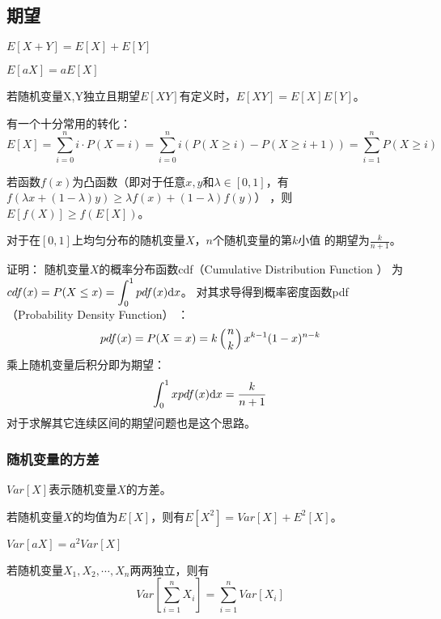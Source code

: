 \subsection{期望}
\begin{theorem}[期望的线性性质]
    $E[X+Y]=E[X]+E[Y]$
\end{theorem}
\begin{theorem}
    $E[aX]=aE[X]$
\end{theorem}
\begin{theorem}
    若随机变量X,Y独立且期望$E[XY]$有定义时，$E[XY]=E[X]E[Y]$。
\end{theorem}
有一个十分常用的转化：
\begin{displaymath}
    E[X]=\sum_{i=0}^n{i\cdot P(X=i)}
    =\sum_{i=0}^n{i(P(X\geq i)-P(X\geq i+1))}
    =\sum_{i=1}^n{P(X\geq i)}
\end{displaymath}
\begin{theorem}
    若函数$f(x)$为凸函数（即对于任意$x,y$和$\lambda\in [0,1]$，有
    $f(\lambda x+(1-\lambda)y)\geq\lambda f(x)+(1-\lambda)f(y)$）
    ，则$E[f(X)]\geq f(E[X])$。
\end{theorem}
\begin{theorem}
    对于在$[0,1]$上均匀分布的随机变量$X$，$n$个随机变量的第$k$小值
    的期望为$\frac{k}{n+1}$。
\end{theorem}
证明：
随机变量$X$的概率分布函数cdf（Cumulative Distribution Function
）
为$\displaystyle cdf(x)=P(X\leq x)=\int_0^1{pdf(x)\textrm{d} x}$。
对其求导得到概率密度函数pdf（Probability Density Function）
：
\begin{displaymath}
    pdf(x)=P(X=x)=k\left(n \atop k\right)x^{k-1}(1-x)^{n-k}
\end{displaymath}
乘上随机变量后积分即为期望：
\begin{displaymath}
    \int_0^1{xpdf(x)\textrm{d} x}=\frac{k}{n+1}
\end{displaymath}
对于求解其它连续区间的期望问题也是这个思路。
\subsubsection{随机变量的方差}
$Var[X]$表示随机变量$X$的方差。
\begin{theorem}
    若随机变量$X$的均值为$E[X]$，则有$E[X^2]=Var[X]+E^2[X]$。
\end{theorem}
\begin{theorem}
    $Var[aX]=a^2Var[X]$
\end{theorem}
\begin{theorem}
    若随机变量$X_1,X_2,\cdots,X_n$两两独立，则有
    \begin{displaymath}
        Var[\sum_{i=1}^n{X_i}]=\sum_{i=1}^n{Var[X_i]}
    \end{displaymath}
\end{theorem}
